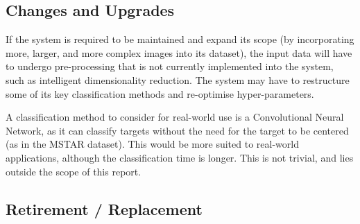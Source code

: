 \subsection{Changes and Upgrades}

If the system is required to be maintained and expand its scope (by incorporating more, larger, and more complex images into its dataset), the input data will have to undergo pre-processing that is not currently implemented into the system, such as intelligent dimensionality reduction. The system may have to restructure some of its key classification methods and re-optimise hyper-parameters. 

A classification method to consider for real-world use is a Convolutional Neural Network, as it can classify targets without the need for the target to be centered (as in the MSTAR dataset). This would be more suited to real-world applications, although the classification time is longer. This is not trivial, and lies outside the scope of this report.

\subsection{Retirement / Replacement}












